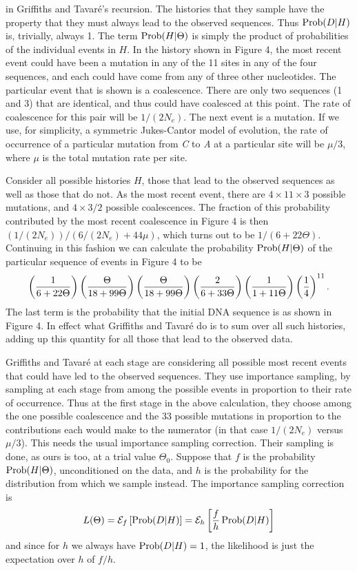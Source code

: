 in Griffiths and Tavar\'e's recursion.  The histories that they sample
have the property that they must always lead to the observed sequences.
Thus $\mathop{\rm Prob}\nolimits(D|H)$ is, trivially, always 1.  The term $\mathop{\rm Prob}\nolimits(H|\Theta)$ is
simply the product of probabilities of the individual events in $H$.  In
the history shown in Figure 4, the most recent event could have been a
mutation in any of the 11 sites in any of the four sequences, and each
could have come from any of three other nucleotides.  The particular
event that is shown is a coalescence.  There are only two sequences (1 and 3)
that are identical, and thus could have coalesced at this point.  The
rate of coalescence for this pair will be $1/(2N_e)$.  The next event is
a mutation.  If we use, for simplicity, a symmetric Jukes-Cantor model of
evolution, the rate of occurrence of a particular mutation from {\it C}
to {\it A} at a particular site will be $\mu/3$, where $\mu$ is the
total mutation rate per site.

Consider all possible histories $H$, those that lead to the observed sequences
as well as those that do not.  As the most recent event, there are
$4\times 11\times3$
possible mutations, and $4\times 3/2$ possible coalescences.  The fraction
of this probability contributed by the most recent coalescence in Figure 4 
is then $(1/(2N_e))/\left(6/(2N_e)+44\mu \right)$, which turns out to be
$1/(6 + 22\Theta)$.  Continuing in this fashion we can calculate
the probability $\mathop{\rm Prob}\nolimits(H|\Theta)$ of the particular sequence of events in Figure 4 to be
\begin{displaymath}
\left({1 \over 6+22\Theta} \right)\left({\Theta \over 18+99\Theta} \right)\left({\Theta \over 18+99\Theta} \right)\left({2 \over 6+33\Theta} \right)\left({1 \over 1+11\Theta} \right)\left(\frac{1}{4}\right)^{11}.
\end{displaymath}
The last term is the probability that the initial DNA sequence is as shown
in Figure 4.
In effect what Griffiths and Tavar\'e do is to sum over all such histories,
adding up this quantity for all those that lead to the observed data. 

Griffiths and Tavar\'e at each stage are considering all possible most
recent events that could have led to the observed sequences.  They use
importance sampling, by sampling at each stage from among the possible
events in proportion to their rate of occurrence.  Thus at the first
stage in the above calculation, they choose among the one possible coalescence
and the 33 possible mutations in proportion to the contributions each would
make to the numerator (in that case $1/(2N_e)$ versus $\mu/3$).
This needs the usual importance sampling correction.   Their sampling is
done, as ours is too, at a trial value $\Theta_0$.  Suppose that $f$ is the
probability
$\mathop{\rm Prob}\nolimits(H|\Theta)$, unconditioned on the data, and $h$ is the
probability for the distribution from which we sample instead.  The
importance sampling correction is
\begin{equation} %
L(\Theta) = {\cal E}_f\left[\Prob(D|H)\right] = {\cal E}_h\left[{f \over h}\Prob
(D|H)\right]
\end{equation}
and since for $h$ we always have $\mathop{\rm Prob}\nolimits(D|H) = 1$, the likelihood is just
the expectation over $h$ of $f/h$.

